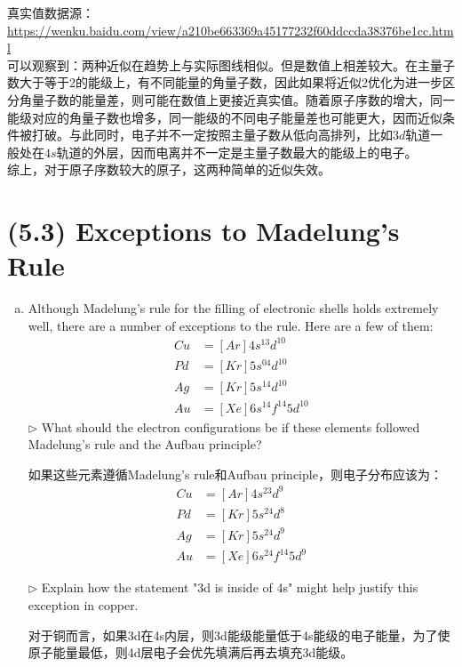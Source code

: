 \documentclass[reqno,a4paper,12pt]{amsart}
\begin{document}
\begin{enumerate}[(a)]
\begin{tcolorbox}[breakable, colback = black!5!white, colframe = black]
	真实值数据源：\url{https://wenku.baidu.com/view/a210be663369a45177232f60ddccda38376be1cc.html} \\
	可以观察到：两种近似在趋势上与实际图线相似。但是数值上相差较大。在主量子数大于等于2的能级上，有不同能量的角量子数，因此如果将近似2优化为进一步区分角量子数的能量差，则可能在数值上更接近真实值。随着原子序数的增大，同一能级对应的角量子数也增多，同一能级的不同电子能量差也可能更大，因而近似条件被打破。与此同时，电子并不一定按照主量子数从低向高排列，比如$3d$轨道一般处在$4s$轨道的外层，因而电离并不一定是主量子数最大的能级上的电子。 \\
	综上，对于原子序数较大的原子，这两种简单的近似失效。
	\end{tcolorbox}
	
\end{enumerate}

\section{\textbf{(5.3) Exceptions to Madelung's Rule}}
\begin{enumerate}[(a)]
	\item Although Madelung's rule for the filling of electronic shells holds extremely well, there are a number of exceptions to the rule. Here are a few of them: 
	\begin{align*}
		Cu &= [Ar]4s^13d^{10} \\
		Pd &= [Kr]5s^04d^{10} \\
		Ag &= [Kr]5s^14d^{10} \\
		Au &= [Xe]6s^14f^{14}5d^{10}
	\end{align*}
	$\triangleright$ What should the electron configurations be if these elements followed Madelung's rule and the Aufbau principle? \\
	\begin{tcolorbox}[breakable, colback = black!5!white, colframe = black]
	如果这些元素遵循Madelung's rule和Aufbau principle，则电子分布应该为：
	\begin{align*}
		Cu &= [Ar]4s^23d^{9} \\
		Pd &= [Kr]5s^24d^{8} \\
		Ag &= [Kr]5s^24d^{9} \\
		Au &= [Xe]6s^24f^{14}5d^{9}
	\end{align*}
	\end{tcolorbox}
	$\triangleright$ Explain how the statement "3d is inside of 4s" might help justify this exception in copper.
	\begin{tcolorbox}[breakable, colback = black!5!white, colframe = black]
	对于铜而言，如果3d在4s内层，则3d能级能量低于4s能级的电子能量，为了使原子能量最低，则4d层电子会优先填满后再去填充3d能级。
	\end{tcolorbox}
\end{enumerate}
\end{document}
